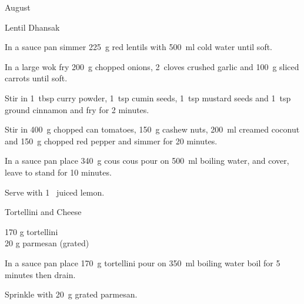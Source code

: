 \begin{menu}{August}
\begin{recipe}{2}{Lentil Dhansak}
	
	
    \begin{instructions}
    \item 
        In a sauce pan simmer
        225~g  red lentils
        with 500~ml  cold water
        until soft.
      \item 
        In a large wok fry
        200~g chopped onions,
        2~cloves crushed garlic
        and
        100~g sliced carrots
        until soft.
      \item 
        Stir in
        1~tbsp  curry powder,
        1~tsp  cumin seeds,
        1~tsp  mustard seeds
        and
        1~tsp  ground cinnamon
        and fry for 2 minutes.
      \item 
        Stir in
        400~g chopped can tomatoes,
        150~g  cashew nuts,
        200~ml  creamed coconut
        and
        150~g chopped red pepper
        and simmer for 20 minutes.
      \item 
    In a
    sauce pan 
    place
    340~g  cous cous
    pour on
    500~ml  boiling water,
    and cover, leave to stand for 10 minutes.
  \item 
        Serve with
        1~ juiced lemon.
      
    \end{instructions}
    \end{recipe}%
  
    \begin{recipe}{1}{Tortellini and Cheese}%
		\begin{ingredients}
		170 g tortellini  \\
	20 g parmesan (grated) \\
	
		\end{ingredients}
	
	
    \begin{instructions}
    \item 
    In a
    sauce pan
    place
    170~g  tortellini
    pour on
    350~ml  boiling water
    boil for 5 minutes then drain.
  \item 
        Sprinkle with
        20~g grated parmesan.
      
    \end{instructions}
    \end{recipe}%
  
    \clearpage
    \end{menu}
	
